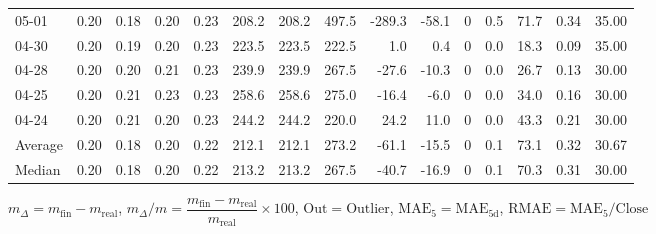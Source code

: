 \begin{threeparttable}
{\begin{tabular}{lrrrrrrrrrrrrrr}
  05-01 &          0.20 &          0.18 &          0.20 &        0.23 &               208.2 &              208.2 &               497.5 &     -289.3 &        -58.1 &              0 &                 0.5 &             71.7 &            0.34 &                  35.00 \\
  04-30 &          0.20 &          0.19 &          0.20 &        0.23 &               223.5 &              223.5 &               222.5 &        1.0 &          0.4 &              0 &                 0.0 &             18.3 &            0.09 &                  35.00 \\
  04-28 &          0.20 &          0.20 &          0.21 &        0.23 &               239.9 &              239.9 &               267.5 &      -27.6 &        -10.3 &              0 &                 0.0 &             26.7 &            0.13 &                  30.00 \\
  04-25 &          0.20 &          0.21 &          0.23 &        0.23 &               258.6 &              258.6 &               275.0 &      -16.4 &         -6.0 &              0 &                 0.0 &             34.0 &            0.16 &                  30.00 \\
  04-24 &          0.20 &          0.21 &          0.20 &        0.23 &               244.2 &              244.2 &               220.0 &       24.2 &         11.0 &              0 &                 0.0 &             43.3 &            0.21 &                  30.00 \\
Average &          0.20 &          0.18 &          0.20 &        0.22 &               212.1 &              212.1 &               273.2 &      -61.1 &        -15.5 &              0 &                 0.1 &             73.1 &            0.32 &                  30.67 \\
 Median &          0.20 &          0.18 &          0.20 &        0.22 &               213.2 &              213.2 &               267.5 &      -40.7 &        -16.9 &              0 &                 0.1 &             70.3 &            0.31 &                  30.00 \\
\bottomrule
\end{tabular}
}
\begin{tablenotes}\footnotesize
\item $m_\Delta=m_{\text{fin}}-m_{\text{real}}$,
$m_\Delta/m=\dfrac{m_{\text{fin}}-m_{\text{real}}}{m_{\text{real}}}\times100$,
$\mathrm{Out}=\text{Outlier}$,
$\mathrm{MAE}_5=\mathrm{MAE}_{5\text{d}}$,
$\mathrm{RMAE}=\mathrm{MAE}_5/\text{Close}$
\end{tablenotes}
\end{threeparttable}
\endgroup

